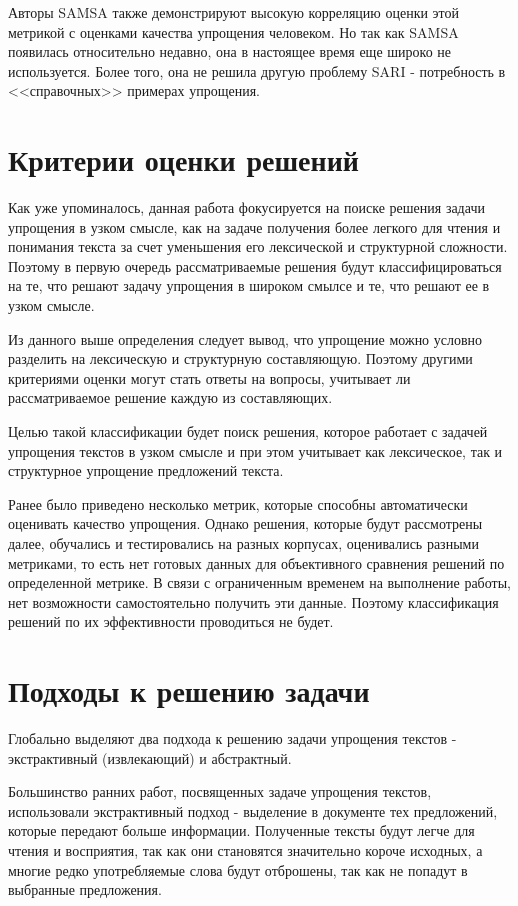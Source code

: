 Авторы SAMSA также демонстрируют высокую корреляцию оценки этой метрикой с оценками качества упрощения человеком. Но так как SAMSA появилась относительно недавно, она в настоящее время еще широко не используется. Более того, она не решила другую проблему SARI - потребность в <<справочных>> примерах упрощения.


\section{Критерии оценки решений}

Как уже упоминалось, данная работа фокусируется на поиске решения задачи упрощения в узком смысле, как на задаче получения более легкого для чтения и понимания текста за счет уменьшения его лексической и структурной сложности\cite{martin_muss_2021}. Поэтому в первую очередь рассматриваемые решения будут классифицироваться на те, что решают задачу упрощения в широком смылсе и те, что решают ее в узком смысле.

Из данного выше определения следует вывод, что упрощение можно условно разделить на лексическую и структурную составляющую. Поэтому другими критериями оценки могут стать ответы на вопросы, учитывает ли рассматриваемое решение каждую из составляющих.

Целью такой классификации будет поиск решения, которое работает с задачей упрощения текстов в узком смысле и при этом учитывает как лексическое, так и структурное упрощение предложений текста.

Ранее было приведено несколько метрик, которые способны автоматически оценивать качество упрощения. Однако решения, которые будут рассмотрены далее, обучались и тестировались на разных корпусах, оценивались разными метриками, то есть нет готовых данных для объективного сравнения решений по определенной метрике. В связи с ограниченным временем на выполнение работы, нет возможности самостоятельно получить эти данные. Поэтому классификация решений по их эффективности проводиться не будет.


\section{Подходы к решению задачи}

Глобально выделяют два подхода к решению задачи упрощения текстов - экстрактивный (извлекающий) и абстрактный.

Большинство ранних работ, посвященных задаче упрощения текстов, использовали экстрактивный подход - выделение в документе тех предложений, которые передают больше информации. Полученные тексты будут легче для чтения и восприятия, так как они становятся значительно короче исходных, а многие редко употребляемые слова будут отброшены, так как не попадут в выбранные предложения. 

